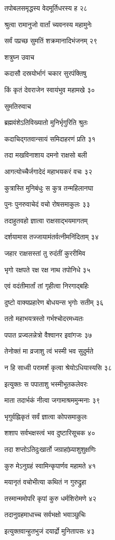 तपोबलसमृद्धस्य वेदमूर्तिधरस्य ह २८

श्रुत्वा रामानुजो वार्तां च्यवनस्य महामुनेः

सर्वं पप्रच्छ सुमतिं शक्रमानादिभंजनम् २९

शत्रुघ्न उवाच

कदासौ दस्रयोर्भागं चकार सुरपंक्तिषु

किं कृतं देवराजेन स्वायंभुव महामखे ३०

सुमतिरुवाच

ब्रह्मवंशेऽतिविख्यातो मुनिर्भृगुरिति श्रुतः

कदाचिद्गतवान्सायं समिदाहरणं प्रति ३१

तदा मखविनाशाय दमनो राक्षसो बली

आगत्योच्चैर्जगादेदं महाभयकरं वचः ३२

कुत्रास्ति मुनिबंधुः स कुत्र तन्महिलानघा

पुनः पुनरुवाचेदं वचो रोषसमाकुलः ३३

तदाहुतवहो ज्ञात्वा राक्षसाद्भयमागतम्

दर्शयामास तज्जायामंतर्वत्नीमनिंदिताम् ३४

जहार राक्षसस्तां तु रुदंतीं कुररीमिव

भृगो रक्षपते रक्ष रक्ष नाथ तपोनिधे ३५

एवं वदंतीमार्तां तां गृहीत्वा निरगाद्बहिः

दुष्टो वाक्यप्रहारेण बोधयन्स भृगोः सतीम् ३६

ततो महाभयत्रस्तो गर्भश्चोदरमध्यतः

पपात प्रज्वलन्नेत्रो वैश्वानर इवांगजः ३७

तेनोक्तं मा व्रजाशु त्वं भस्मी भव सुदुर्मते

न हि साध्वी परामर्शं कृत्वा श्रेयोऽधियास्यसि ३८

इत्युक्तः स पपाताशु भस्मीभूतकलेवरः

माता तदार्भकं नीत्वा जगामाश्रममुन्मनाः ३९

भृगुर्वह्निकृतं सर्वं ज्ञात्वा कोपसमाकुलः

शशाप सर्वभक्षस्त्वं भव दुष्टारिसूचक ४०

तदा शप्तोऽतिदुःखार्तो जग्राहांघ्र्याशुशुक्षणिः

कुरु मेऽनुग्रहं स्वामिन्कृपार्णव महामते ४१

मयानृतं वचोभीत्या कथितं न गुरुद्रुहा

तस्मान्ममोपरि कृपां कुरु धर्मशिरोमणे ४२

तदानुग्रहमाधाच्च सर्वभक्षो भवाञ्छुचिः

इत्युक्तवान्हुतभुजं दयार्द्रो मुनितापसः ४३

